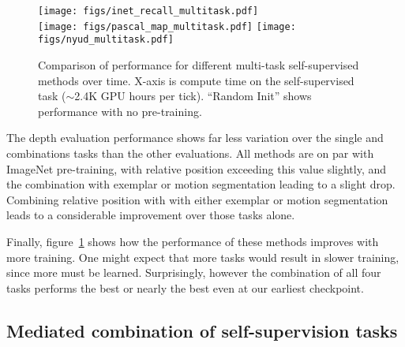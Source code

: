\documentclass[10pt,twocolumn,letterpaper]{article}
\begin{document}
\begin{figure}[t]
\begin{center}

   \texttt{[image: figs/inet\_recall\_multitask.pdf]}\\
   \texttt{[image: figs/pascal\_map\_multitask.pdf]}
   \texttt{[image: figs/nyud\_multitask.pdf]}
   
\end{center}
   \caption{
   Comparison of performance for different multi-task self-supervised methods over time.  X-axis is compute time on the self-supervised task ($\sim$2.4K GPU hours per tick).  ``Random Init'' shows performance with no pre-training.
   }
   
\label{fig:multitask_comparison}
\end{figure}

The depth evaluation performance shows far less variation over the single and combinations tasks than the other evaluations.
All methods are on par with ImageNet pre-training, with relative position exceeding this value slightly, and the
combination with exemplar or motion segmentation leading to a slight drop.
Combining relative position with with either exemplar or motion segmentation leads to a considerable improvement over those tasks alone.

Finally, figure~\ref{fig:multitask_comparison} shows how the performance of these methods improves with more training.  
One might expect that more tasks would result in slower training, since more must be learned.
Surprisingly, however the combination of all four tasks performs the best or nearly the best even at our earliest checkpoint.  


\subsection{Mediated combination of self-supervision tasks}
\end{document}
